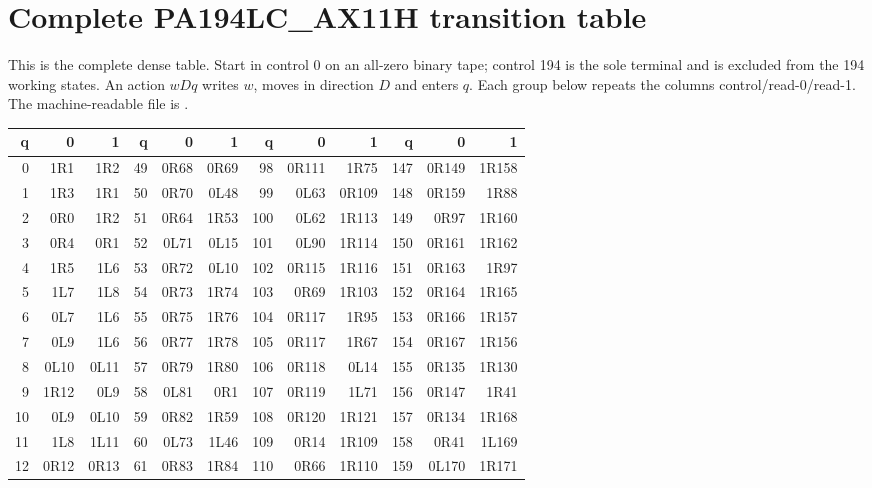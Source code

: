 \section{Complete PA194LC\_AX11H transition table}
\label{app:lc-ax11h-table}
This is the complete dense table. Start in control 0 on an all-zero
binary tape; control 194 is the sole terminal and is excluded from the
194 working states. An action $wDq$ writes $w$, moves in direction $D$
and enters $q$. Each group below repeats the columns control/read-0/read-1.
The machine-readable file is .

\begin{center}
\scriptsize\ttfamily
\setlength{\tabcolsep}{5pt}
\renewcommand{\arraystretch}{1.15}
\begin{tabular}{@{}rrr@{\hspace{11pt}}rrr@{\hspace{11pt}}rrr@{\hspace{11pt}}rrr@{}}
\toprule
q & 0 & 1 & q & 0 & 1 & q & 0 & 1 & q & 0 & 1 \\
\midrule
0 & 1R1 & 1R2 & 49 & 0R68 & 0R69 & 98 & 0R111 & 1R75 & 147 & 0R149 & 1R158 \\
1 & 1R3 & 1R1 & 50 & 0R70 & 0L48 & 99 & 0L63 & 0R109 & 148 & 0R159 & 1R88 \\
2 & 0R0 & 1R2 & 51 & 0R64 & 1R53 & 100 & 0L62 & 1R113 & 149 & 0R97 & 1R160 \\
3 & 0R4 & 0R1 & 52 & 0L71 & 0L15 & 101 & 0L90 & 1R114 & 150 & 0R161 & 1R162 \\
4 & 1R5 & 1L6 & 53 & 0R72 & 0L10 & 102 & 0R115 & 1R116 & 151 & 0R163 & 1R97 \\
5 & 1L7 & 1L8 & 54 & 0R73 & 1R74 & 103 & 0R69 & 1R103 & 152 & 0R164 & 1R165 \\
6 & 0L7 & 1L6 & 55 & 0R75 & 1R76 & 104 & 0R117 & 1R95 & 153 & 0R166 & 1R157 \\
7 & 0L9 & 1L6 & 56 & 0R77 & 1R78 & 105 & 0R117 & 1R67 & 154 & 0R167 & 1R156 \\
8 & 0L10 & 0L11 & 57 & 0R79 & 1R80 & 106 & 0R118 & 0L14 & 155 & 0R135 & 1R130 \\
9 & 1R12 & 0L9 & 58 & 0L81 & 0R1 & 107 & 0R119 & 1L71 & 156 & 0R147 & 1R41 \\
10 & 0L9 & 0L10 & 59 & 0R82 & 1R59 & 108 & 0R120 & 1R121 & 157 & 0R134 & 1R168 \\
11 & 1L8 & 1L11 & 60 & 0L73 & 1L46 & 109 & 0R14 & 1R109 & 158 & 0R41 & 1L169 \\
12 & 0R12 & 0R13 & 61 & 0R83 & 1R84 & 110 & 0R66 & 1R110 & 159 & 0L170 & 1R171 \\

\end{tabular}
\end{center}
